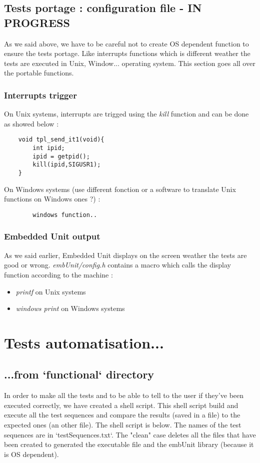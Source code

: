 \documentclass[10pt]{article}
\begin{document}
\subsection{Tests portage : configuration file - IN PROGRESS} \label{test_portage}
	As we said above, we have to be careful not to create OS dependent function to ensure the tests portage. Like interrupts functions which is different weather the tests are executed in Unix, Window... operating system. This section goes all over the portable functions.
	
	\subsubsection{Interrupts trigger}
	On Unix systems, interrupts are trigged using the \textit{kill} function and can be done as showed below :
	\begin{lstlisting}
	void tpl_send_it1(void){
		int ipid;
		ipid = getpid();
		kill(ipid,SIGUSR1);
	}
	\end{lstlisting}
	On Windows systems (use different fonction or a software to translate Unix functions on Windows ones ?) :
	\begin{lstlisting}
		windows function..
	\end{lstlisting}
		
	\subsubsection{Embedded Unit output}
	As we said earlier, Embedded Unit displays on the screen weather the tests are good or wrong. \textit{embUnit/config.h} contains a macro which calls the display function according to the machine :
	\begin{itemize}
	\item \textit{printf} on Unix systems 
	\item \textit{windows print} on Windows systems
	\end{itemize}

\section{Tests automatisation...}
\subsection{...from `functional` directory}
	In order to make all the tests and to be able to tell to the user if they've been executed correctly, we have created a shell script. This shell script build and execute all the test sequences and compare the results (saved in a file) to the expected ones (an other file). The shell script is below. The names of the test sequences are in `testSequences.txt`. The "clean" case deletes all the files that have been created to generated the executable file and the embUnit library (because it is OS dependent).
	
	
\end{document}
